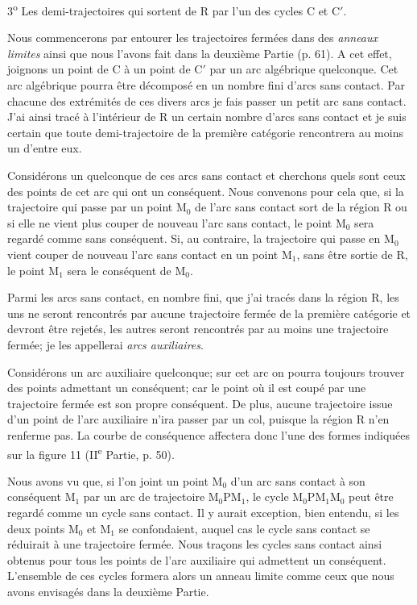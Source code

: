 \documentclass[11pt]{article}
\begin{document}
3\textsuperscript{o} Les demi-trajectoires qui sortent de R par l’un des cycles C et C$'$.

Nous commencerons par entourer les trajectoires fermées dans des \emph{anneaux limites} ainsi que nous l’avons fait dans la deuxième Partie (p. 61). A cet effet, joignons un point de C à un point de C$'$ par un arc algébrique quelconque. Cet arc algébrique pourra être décomposé en un nombre fini d’arcs sans contact. Par chacune des extrémités de ces divers arcs je fais passer un petit arc sans contact. J’ai ainsi tracé à l’intérieur de R un certain nombre d’arcs sans contact et je suis certain que toute demi-trajectoire de la première catégorie rencontrera au moins un d’entre eux.

Considérons un quelconque de ces arcs sans contact et cherchons quels sont ceux des points de cet arc qui ont un conséquent. Nous convenons pour cela que, si la trajectoire qui passe par un point $\mathrm{M}_0$ de l’arc sans contact sort de la région R ou si elle ne vient plus couper de nouveau l’arc sans contact, le point $\mathrm{M}_0$ sera regardé comme sans conséquent. Si, au contraire, la trajectoire qui passe en $\mathrm{M}_0$ vient couper de nouveau l’arc sans contact en un point $\mathrm{M}_1$, sans être sortie de R, le point $\mathrm{M}_1$ sera le conséquent de $\mathrm{M}_0$.

Parmi les arcs sans contact, en nombre fini, que j’ai tracés dans la région R, les uns ne seront rencontrés par aucune trajectoire fermée de la première catégorie et devront être rejetés, les autres seront rencontrés par au moins une trajectoire fermée; je les appellerai \emph{arcs auxiliaires}.

Considérons un arc auxiliaire quelconque; sur cet arc on pourra toujours trouver des points admettant un conséquent; car le point où il est coupé par une trajectoire fermée est son propre conséquent. De plus, aucune trajectoire issue d’un point de l’arc auxiliaire n’ira passer par un col, puisque la région R n’en renferme pas. La courbe de conséquence affectera donc l’une des formes indiquées sur la figure 11 (II\textsuperscript{e} Partie, p. 50).

Nous avons vu que, si l’on joint un point $\mathrm{M}_0$ d’un arc sans contact à son conséquent $\mathrm{M}_1$ par un arc de trajectoire $\mathrm{M}_0\mathrm{P}\mathrm{M}_1$, le cycle $\mathrm{M}_0\mathrm{P}\mathrm{M}_1\mathrm{M}_0$ peut être regardé comme un cycle sans contact. Il y aurait exception, bien entendu, si les deux points $\mathrm{M}_0$ et $\mathrm{M}_1$ se confondaient, auquel cas le cycle sans contact se réduirait à une trajectoire fermée. Nous traçons les cycles sans contact ainsi obtenus pour tous les points de l’arc auxiliaire qui admettent un conséquent. L’ensemble de ces cycles formera alors un anneau limite comme ceux que nous avons envisagés dans la deuxième Partie.
\end{document}
